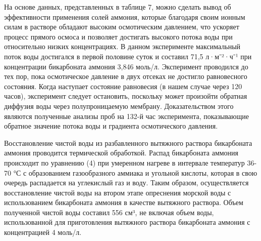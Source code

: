 
На основе данных, представленных в таблице 7, можно сделать вывод об
эффективности применения солей аммония, которые благодаря своим ионным
силам в растворе обладают высоким осмотическим давлением, что ускоряет
процесс прямого осмоса и позволяет достигать высокого потока воды при
относительно низких концентрациях. В данном эксперименте максимальный
поток воды достигался в первой половине суток и составил 71,5 л·м⁻²·ч⁻¹
при концентрации бикарбоната аммония 3,846 моль/л. Эксперимент
проводился до тех пор, пока осмотическое давление в двух отсеках не
достигло равновесного состояния. Когда наступает состояние равновесия (в
нашем случае через 120 часов), эксперимент следует остановить, поскольку
может произойти обратная диффузия воды через полупроницаемую мембрану.
Доказательством этого являются полученные анализы проб на 132-й час
эксперимента, показывающие обратное значение потока воды и градиента
осмотического давления.

Восстановление чистой воды из разбавленного вытяжного раствора
бикарбоната аммония проводится термической обработкой. Распад
бикарбоната аммония происходит по уравнению (4) при умеренном нагреве в
интервале температур 36-70 °С с образованием газообразного аммиака и
угольной кислоты, которая в свою очередь распадается на углекислый газ и
воду. Таким образом, осуществляется восстановление чистой воды на втором
этапе опреснения морской воды с использованием бикарбоната аммония в
качестве вытяжного раствора. Объем полученной чистой воды составил 556
см³, не включая объем воды, использованной для приготовления вытяжного
раствора бикарбоната аммония с концентрацией 4 моль/л.

